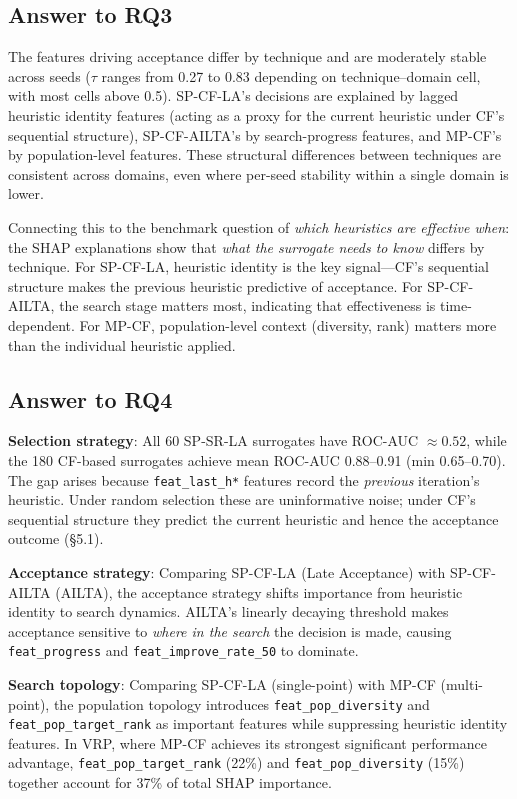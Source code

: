 \documentclass[11pt,a4paper]{article}
\begin{document}
\subsection{Answer to RQ3}

The features driving acceptance differ by technique and are moderately stable across
seeds ($\tau$ ranges from 0.27 to 0.83 depending on technique--domain cell, with most
cells above 0.5). SP-CF-LA's decisions are explained by lagged heuristic
identity features (acting as a proxy for the current heuristic under CF's
sequential structure), SP-CF-AILTA's by search-progress features, and
MP-CF's by population-level features.
These structural differences between techniques are consistent across domains, even
where per-seed stability within a single domain is lower.

Connecting this to the benchmark question of \emph{which heuristics are effective when}:
the SHAP explanations show that \emph{what the surrogate needs to know} differs by
technique. For SP-CF-LA, heuristic identity is the key signal---CF's sequential
structure makes the previous heuristic predictive of acceptance. For SP-CF-AILTA,
the search stage matters most, indicating that effectiveness is time-dependent. For
MP-CF, population-level context (diversity, rank) matters more than the individual
heuristic applied.

\subsection{Answer to RQ4}

\textbf{Selection strategy}: All 60 SP-SR-LA surrogates have ROC-AUC $\approx 0.52$,
while the 180 CF-based surrogates achieve mean ROC-AUC 0.88--0.91
(min 0.65--0.70). The gap arises because
\texttt{feat\_last\_h*} features record the \emph{previous} iteration's heuristic.
Under random selection these are uninformative noise; under CF's sequential
structure they predict the current heuristic and hence the acceptance outcome
(\S5.1).

\textbf{Acceptance strategy}: Comparing SP-CF-LA (Late Acceptance) with SP-CF-AILTA
(AILTA), the acceptance strategy shifts importance from heuristic identity to search
dynamics. AILTA's linearly decaying threshold makes acceptance sensitive to
\emph{where in the search} the decision is made, causing \texttt{feat\_progress} and
\texttt{feat\_improve\_rate\_50} to dominate.

\textbf{Search topology}: Comparing SP-CF-LA (single-point) with MP-CF (multi-point),
the population topology introduces \texttt{feat\_pop\_diversity} and
\texttt{feat\_pop\_target\_rank} as important features while suppressing heuristic
identity features. In VRP, where MP-CF achieves its strongest significant performance
advantage, \texttt{feat\_pop\_target\_rank} (22\%) and \texttt{feat\_pop\_diversity}
(15\%) together account for 37\% of total SHAP importance.
\end{document}
